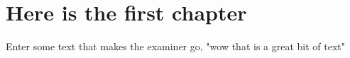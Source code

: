 \chapter{Here is the first chapter}

Enter some text that makes the examiner go, "wow that is a great bit of text"

